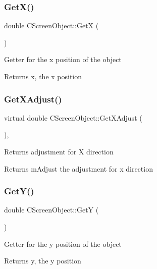 \subsubsection{\texorpdfstring{GetX()}{GetX()}}
{\footnotesize\ttfamily double C\+Screen\+Object\+::\+GetX (\begin{DoxyParamCaption}{ }\end{DoxyParamCaption})\hspace{0.3cm}{\ttfamily [inline]}}

Getter for the x position of the object \begin{DoxyReturn}{Returns}
x, the x position 
\end{DoxyReturn}
\mbox{\label{class_c_screen_object_abec4a44a5e437c944188081ccdf41d50}} 
\subsubsection{\texorpdfstring{GetXAdjust()}{GetXAdjust()}}
{\footnotesize\ttfamily virtual double C\+Screen\+Object\+::\+Get\+X\+Adjust (\begin{DoxyParamCaption}{ }\end{DoxyParamCaption})\hspace{0.3cm}{\ttfamily [inline]}, {\ttfamily [virtual]}}

Returns adjustment for X direction \begin{DoxyReturn}{Returns}
m\+Adjust the adjustment for x direction 
\end{DoxyReturn}
\mbox{\label{class_c_screen_object_a1c01dbcad26ade4d4989e9b9f61fd0c8}} 
\subsubsection{\texorpdfstring{GetY()}{GetY()}}
{\footnotesize\ttfamily double C\+Screen\+Object\+::\+GetY (\begin{DoxyParamCaption}{ }\end{DoxyParamCaption})\hspace{0.3cm}{\ttfamily [inline]}}

Getter for the y position of the object \begin{DoxyReturn}{Returns}
y, the y position 
\end{DoxyReturn}
\mbox{\label{class_c_screen_object_a92a3f69608fa214184c0c82a33569a07}} 

